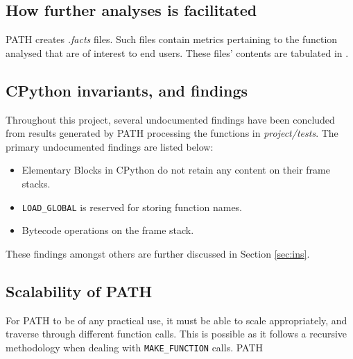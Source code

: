         \subsection{How further analyses is facilitated}
        \par \acs{PATH} creates \textit{.facts} files. Such files contain metrics pertaining to the function analysed that are of interest to end users.
        These files' contents are tabulated in .
        \subsection{CPython invariants, and findings}
        \par Throughout this project, several undocumented findings have been concluded from results generated by \acs{PATH} processing the functions in \textit{project/tests}.
        The primary undocumented findings are listed below:
        \begin{itemize}
            \item Elementary Blocks in CPython do not retain any content on their frame stacks.
            \item \lstinline|LOAD_GLOBAL| is reserved for storing function names.
            \item Bytecode operations on the frame stack. 
        \end{itemize}
        These findings amongst others are further discussed in Section \ref{sec:ins}.
        \subsection{Scalability of \acs{PATH}}
        For \acs{PATH} to be of any practical use, it must be able to scale appropriately, and traverse through different function calls.  
        This is possible as it follows a recursive methodology when dealing with \lstinline|MAKE_FUNCTION| calls. \acs{PATH} 
